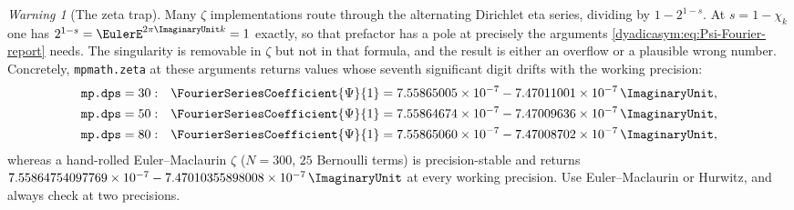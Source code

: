 \documentclass[11pt,oneside]{article}
\theoremstyle{definition}
\theoremstyle{remark}
\newtheorem{warning}[warning]{Warning}
\begin{document}
\begin{warning}[The zeta trap]
Many $\zeta$ implementations route through the alternating Dirichlet eta
series, dividing by $1-2^{1-s}$.  At $s=1-\chi_k$ one has
$2^{1-s}=\EulerE^{2\pi\ImaginaryUnit k}=1$ exactly, so that prefactor has a pole at precisely
the arguments \cref{dyadicasym:eq:Psi-Fourier-report} needs.  The singularity is removable in $\zeta$
but not in that formula, and the result is either an overflow or a plausible
wrong number.  Concretely, \texttt{mpmath.zeta} at these arguments returns
values whose seventh significant digit drifts with the working precision:
\[
\begin{aligned}
  \texttt{mp.dps}=30:&\quad \FourierSeriesCoefficient{\Psi}{1}
    =7.55865005\times10^{-7}-7.47011001\times10^{-7}\,\ImaginaryUnit,\\
  \texttt{mp.dps}=50:&\quad \FourierSeriesCoefficient{\Psi}{1}
    =7.55864674\times10^{-7}-7.47009636\times10^{-7}\,\ImaginaryUnit,\\
  \texttt{mp.dps}=80:&\quad \FourierSeriesCoefficient{\Psi}{1}
    =7.55865060\times10^{-7}-7.47008702\times10^{-7}\,\ImaginaryUnit,
\end{aligned}
\]
whereas a hand-rolled Euler--Maclaurin $\zeta$ ($N=300$, $25$ Bernoulli terms)
is precision-stable and returns
$7.55864754097769\times10^{-7}-7.47010355898008\times10^{-7}\,\ImaginaryUnit$ at every
working precision.  Use Euler--Maclaurin or Hurwitz, and always check at two
precisions.
\end{warning}
\end{document}
